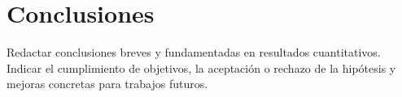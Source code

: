 \section{Conclusiones}

Redactar conclusiones breves y fundamentadas en resultados cuantitativos. Indicar el cumplimiento de objetivos, la aceptación o rechazo de la hipótesis y mejoras concretas para trabajos futuros.
